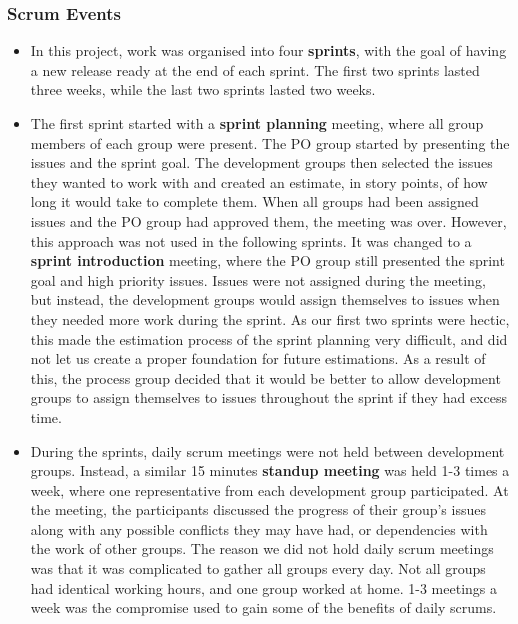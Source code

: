 \subsubsection{Scrum Events}
\begin{itemize}
\item In this project, work was organised into four \textbf{sprints}, with the goal of having a new release ready at the end of each sprint. The first two sprints lasted three weeks, while the last two sprints lasted two weeks.

\item The first sprint started with a \textbf{sprint planning} meeting, where all group members of each group were present. The PO group started by presenting the issues and the sprint goal. The development groups then selected the issues they wanted to work with and created an estimate, in story points, of how long it would take to complete them. When all groups had been assigned issues and the PO group had approved them, the meeting was over. 
However, this approach was not used in the following sprints. It was changed to a \textbf{sprint introduction} meeting, where the PO group still presented the sprint goal and high priority issues. Issues were not assigned during the meeting, but instead, the development groups would assign themselves to issues when they needed more work during the sprint. 
As our first two sprints were hectic, this made the estimation process of the sprint planning very difficult, and did not let us create a proper foundation for future estimations. As a result of this, the process group decided that it would be better to allow development groups to assign themselves to issues throughout the sprint if they had excess time.  

\item During the sprints, daily scrum meetings were not held between development groups. Instead, a similar 15 minutes \textbf{standup meeting} was held 1-3 times a week, where one representative from each development group participated. At the meeting, the participants discussed the progress of their group's issues along with any possible conflicts they may have had, or dependencies with the work of other groups.
The reason we did not hold daily scrum meetings was that it was complicated to gather all groups every day. Not all groups had identical working hours, and one group worked at home. 1-3 meetings a week was the compromise used to gain some of the benefits of daily scrums. 


\end{itemize}
